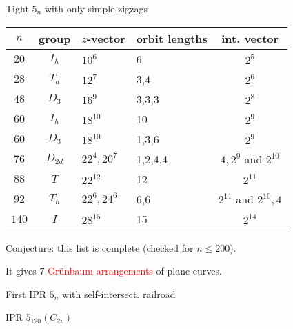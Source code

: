 \documentclass[%
pdf,
colorBG,
slideColor,
]{prosper}
\begin{document}
\begin{slide}{Tight $5_n$ with only simple zigzags}
{\scriptsize
\begin{center}
\begin{tabular}{||c|c|l|l|c||}
\hline
\hline
$n$       &group          &$z$-vector     &orbit lengths  &int. vector\\
\hline \hline
$20$    &$I_h$          &$10^6$         &6              &$2^5$ \\
$28$    &$T_d$          &$12^7$         &3,4            &$2^6$\\
$48$    &$D_3$          &$16^9$         &3,3,3          &$2^8$\\
$60$    &$I_h$          &$18^{10}$      &10             &$2^9$\\
$60$    &$D_3$          &$18^{10}$      &1,3,6          &$2^9$\\
$76$    &$D_{2d}$       &$22^4,20^7$    &1,2,4,4        &$4,2^9$ and $2^{10}$\\
$88$    &$T$            &$22^{12}$      &12             &$2^{11}$\\
$92$    &$T_h$          &$22^6, 24^6$   &6,6            &$2^{11}$ and $2^{10}, 4$\\
$140$   &$I$            &$28^{15}$      &15             &$2^{14}$\\
\hline
\hline
\end{tabular}
\end{center}
}
Conjecture: this list is complete (checked for $n\leq 200$).

It gives $7$ \textcolor{red}{Gr\"unbaum arrangements} of plane curves.

\end{slide}




\begin{slide}{First IPR $5_n$ with self-intersect. railroad}
\begin{center}
\centering
{}\par
\end{center}
\end{slide}

\begin{slide}{IPR $5_{120}(C_{2v})$}
\begin{center}
\centering
{}\par
\end{center}
\end{slide}
\end{document}
